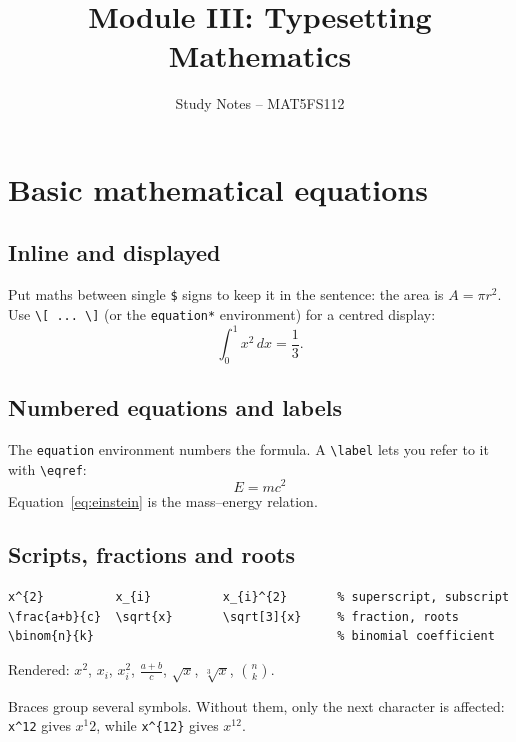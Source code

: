 \documentclass[11pt,a4paper]{article}
\title{Module III: Typesetting Mathematics}
\author{Study Notes -- MAT5FS112}
\date{}
\begin{document}
\maketitle

\section{Basic mathematical equations}

\subsection{Inline and displayed}

Put maths between single \verb|$| signs to keep it in the sentence:
the area is $A = \pi r^2$. Use \verb|\[ ... \]| (or the
\texttt{equation*} environment) for a centred display:
\[
  \int_0^1 x^2\,dx = \frac{1}{3}.
\]

\subsection{Numbered equations and labels}

The \texttt{equation} environment numbers the formula. A \verb|\label|
lets you refer to it with \verb|\eqref|:
\begin{equation}
  E = mc^2 \label{eq:einstein}
\end{equation}
Equation~\eqref{eq:einstein} is the mass--energy relation.

\subsection{Scripts, fractions and roots}

\begin{verbatim}
x^{2}          x_{i}          x_{i}^{2}       % superscript, subscript
\frac{a+b}{c}  \sqrt{x}       \sqrt[3]{x}     % fraction, roots
\binom{n}{k}                                  % binomial coefficient
\end{verbatim}

Rendered: $x^{2}$, $x_{i}$, $x_{i}^{2}$, $\frac{a+b}{c}$,
$\sqrt{x}$, $\sqrt[3]{x}$, $\binom{n}{k}$.

Braces group several symbols. Without them, only the next character is
affected: \verb|x^12| gives $x^1 2$, while \verb|x^{12}| gives $x^{12}$.
\end{document}
